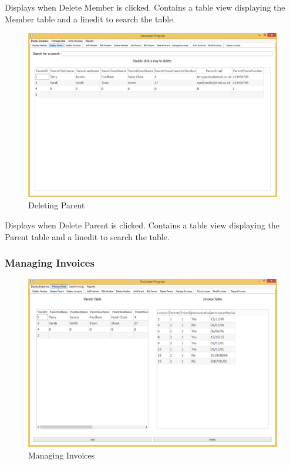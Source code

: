 Displays when Delete Member is clicked. Contains a table view displaying the Member table and a linedit to search the table.

\begin{figure}[H]
\includegraphics[width=\textwidth]{./Maintenance/Images/DeleteParent.png}
    \caption{Deleting Parent} \label{fig:delete_parent}
\end{figure}

Displays when Delete Parent is clicked. Contains a table view displaying the Parent table and a linedit to search the table.

\subsubsection{Managing Invoices}
\begin{figure}[H]
\includegraphics[width=\textwidth]{./Maintenance/Images/ManageInvoice.png}
    \caption{Managing Invoices} \label{fig:manage_invoice}
\end{figure}

